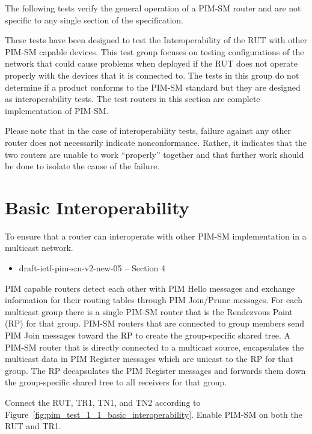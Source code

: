 \documentclass[11pt]{report}
\begin{document}
The following tests verify the general operation of a PIM-SM router and are
not specific to any single section of the specification.

These tests have been designed to test the Interoperability of the RUT with
other PIM-SM capable devices. This test group focuses on testing
configurations of the network that could cause problems when deployed if the
RUT does not operate properly with the devices that it is connected to. The
tests in this group do not determine if a product conforms to the PIM-SM
standard but they are designed as interoperability tests. The test routers in
this section are complete implementation of PIM-SM.

Please note that in the case of interoperability tests, failure against any
other router does not necessarily indicate nonconformance. Rather, it
indicates that the two routers are unable to work ``properly'' together and
that further work should be done to isolate the cause of the failure.

\newpage
\section{Basic Interoperability}

To ensure that a router can interoperate with other PIM-SM
implementation in a multicast network.

\begin{itemize}
  \item draft-ietf-pim-sm-v2-new-05 -- Section 4
\end{itemize}

PIM capable routers detect each other with PIM Hello
messages and exchange information for their routing tables through
PIM Join/Prune messages. For each multicast group there is a single PIM-SM
router that is the Rendezvous Point (RP) for that group. PIM-SM routers that
are connected to group members send PIM Join messages toward the RP to create
the group-specific shared tree. A PIM-SM router that is directly connected to
a multicast source, encapsulates the multicast data in PIM Register messages
which are unicast to the RP for that group. The RP decapsulates the
PIM Register messages and forwards them down the group-specific shared tree to
all receivers for that group.

Connect the RUT, TR1, TN1, and TN2 according to
Figure~\ref{fig:pim_test_1_1_basic_interoperability}.
Enable PIM-SM on both the RUT and TR1.
\end{document}
